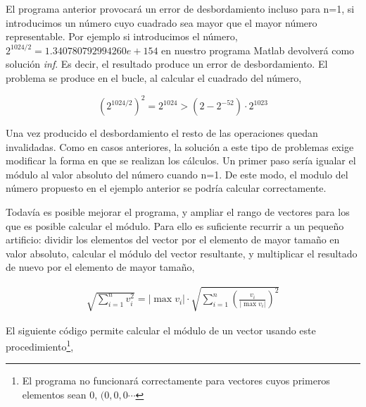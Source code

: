 \begin{paracol}{2}
El programa anterior provocará un error de desbordamiento incluso para n=1, si introducimos un número cuyo cuadrado sea mayor que el mayor número representable. Por ejemplo si introducimos el número, $ 2^{1024/2}=1.340780792994260e+154$ en nuestro programa Matlab devolverá como solución \emph{inf}. Es decir, el resultado produce un error de desbordamiento. El problema se produce en el bucle, al calcular el cuadrado del número,
\end{paracol}
\begin{equation*}
\left(2^{1024/2}\right)^2=2^{1024}> (2-2^{-52})\cdot 2^{1023}
\end{equation*}
\begin{paracol}{2}
Una vez producido el desbordamiento el resto de las operaciones quedan invalidadas. Como en casos anteriores, la solución a este tipo de problemas exige modificar la forma en que se realizan los cálculos. Un primer paso sería igualar el módulo al valor absoluto del número cuando n=1. De este modo, el modulo del número propuesto en el ejemplo anterior se podría calcular correctamente.

Todavía es posible mejorar el programa, y ampliar el rango de vectores para los que es posible calcular el módulo. Para ello es suficiente recurrir a un pequeño artificio: dividir los elementos del vector por el elemento de mayor tamaño en valor absoluto, calcular el módulo del vector resultante, y multiplicar el resultado de nuevo por el elemento de mayor tamaño,
\end{paracol}
\begin{align*}
\sqrt{\sum_{i=1}^nv_i^2}=\vert\max{v_i}\vert\cdot\sqrt{\sum_{i=1}^n\left(\frac{v_i}{\vert\max{v_i}\vert}\right)^2}
\end{align*}
\begin{paracol}{2}
El siguiente código permite calcular el módulo de un vector usando este procedimiento\footnote{El programa no funcionará correctamente para vectores cuyos primeros elementos sean 0, $(0,0,0\cdots$},
\end{paracol}

